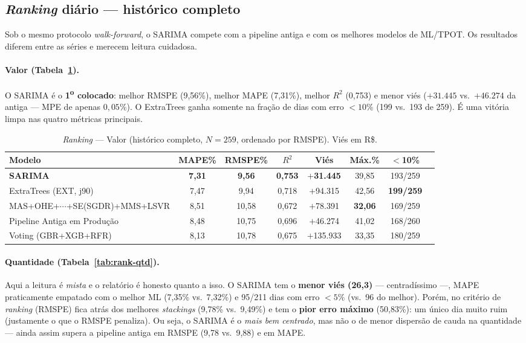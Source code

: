 \documentclass[11pt,a4paper]{article}
\begin{document}
\subsection{\emph{Ranking} diário --- histórico completo}
\label{sec:res-rank}

Sob o mesmo protocolo \emph{walk-forward}, o SARIMA compete com a pipeline antiga e com os melhores
modelos de ML/TPOT. Os resultados diferem entre as séries e merecem leitura cuidadosa.

\paragraph{Valor (Tabela~\ref{tab:rank-valor}).} O SARIMA é o \textbf{1\textsuperscript{o}
colocado}: melhor RMSPE (9,56\%), melhor MAPE (7,31\%), melhor $R^2$ (0,753) e menor viés
($+31.445$ vs.\ $+46.274$ da antiga --- MPE de apenas $0{,}05\%$). O ExtraTrees ganha somente na
fração de dias com erro $<10\%$ (199 vs.\ 193 de 259). É uma vitória limpa nas quatro métricas
principais.

\begin{table}[H]
\centering
\caption{\emph{Ranking} --- Valor (histórico completo, $N=259$, ordenado por RMSPE). Viés em R\$.}
\label{tab:rank-valor}
\small
\setlength{\tabcolsep}{4.5pt}
\begin{tabular}{@{}lccccccc@{}}
\toprule
Modelo & MAPE\% & RMSPE\% & $R^2$ & Viés & Máx.\% & $<$10\% \\
\midrule
\textbf{SARIMA}                & \textbf{7,31} & \textbf{9,56} & \textbf{0,753} & \textbf{$+$31.445} & 39,85 & 193/259 \\
ExtraTrees (EXT, j90)          & 7,47 & 9,94 & 0,718 & $+$94.315 & 42,56 & \textbf{199/259} \\
MAS+OHE+$\cdots$+SE(SGDR)+MMS+LSVR & 8,51 & 10,58 & 0,672 & $+$78.391 & \textbf{32,06} & 169/259 \\
Pipeline Antiga em Produção    & 8,48 & 10,75 & 0,696 & $+$46.274 & 41,02 & 168/260 \\
Voting (GBR+XGB+RFR)           & 8,13 & 10,78 & 0,675 & $+$135.933 & 33,35 & 180/259 \\
\bottomrule
\end{tabular}
\end{table}

\paragraph{Quantidade (Tabela~\ref{tab:rank-qtd}).} Aqui a leitura é \emph{mista} e o relatório é
honesto quanto a isso. O SARIMA tem o \textbf{menor viés (26,3)} --- centradíssimo ---, MAPE
praticamente empatado com o melhor ML (7,35\% vs.\ 7,32\%) e 95/211 dias com erro $<5\%$ (vs.\ 96
do melhor). Porém, no critério de \emph{ranking} (RMSPE) fica atrás dos melhores \emph{stackings}
(9,78\% vs.\ 9,49\%) e tem o \textbf{pior erro máximo} (50,83\%): um único dia muito ruim
(justamente o que o RMSPE penaliza). Ou seja, o SARIMA é o \emph{mais bem centrado}, mas não o de
menor dispersão de cauda na quantidade --- ainda assim supera a pipeline antiga em RMSPE (9,78 vs.\
9,88) e em MAPE.
\end{document}
